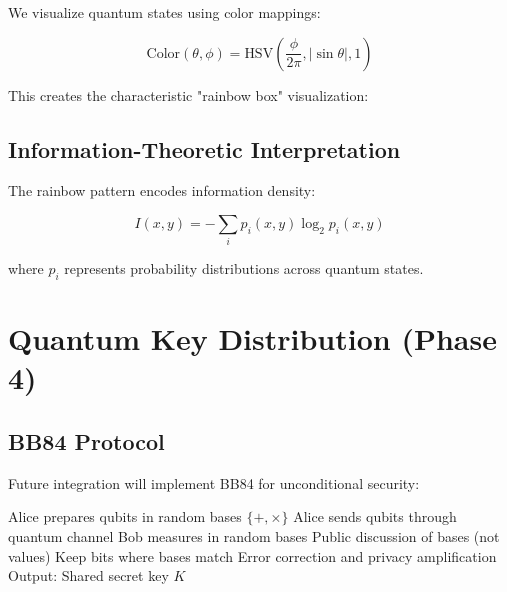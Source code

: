 \documentclass[11pt,a4paper]{article}
\begin{document}
We visualize quantum states using color mappings:

\begin{equation}
\text{Color}(\theta, \phi) = \text{HSV}\left(\frac{\phi}{2\pi}, |\sin\theta|, 1\right)
\end{equation}

This creates the characteristic "rainbow box" visualization:

\begin{figure}[H]
\centering
{}
\end{figure}

\subsection{Information-Theoretic Interpretation}

The rainbow pattern encodes information density:

\begin{equation}
I(x,y) = -\sum_{i} p_i(x,y) \log_2 p_i(x,y)
\end{equation}

where $p_i$ represents probability distributions across quantum states.

\section{Quantum Key Distribution (Phase 4)}

\subsection{BB84 Protocol}

Future integration will implement BB84 for unconditional security:

\begin{algorithm}
\caption{BB84 Quantum Key Distribution}
\begin{algorithmic}
\STATE Alice prepares qubits in random bases $\{+, \times\}$
\STATE Alice sends qubits through quantum channel
\STATE Bob measures in random bases
\STATE Public discussion of bases (not values)
\STATE Keep bits where bases match
\STATE Error correction and privacy amplification
\STATE Output: Shared secret key $K$
\end{algorithmic}
\end{algorithm}
\end{document}
